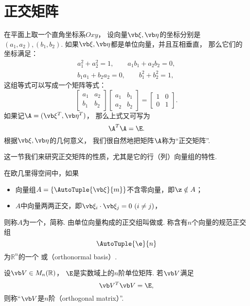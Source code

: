 \section{正交矩阵}
在平面上取一个直角坐标系\(Oxy\)，
设向量\(\a,\b\)的坐标分别是\((a_1,a_2),(b_1,b_2)\).
如果\(\a,\b\)都是单位向量，并且互相垂直，
那么它们的坐标满足：\[
	\begin{split}
		a_1^2+a_2^2=1, \qquad
		a_1b_1+a_2b_2=0, \\
		b_1a_1+b_2a_2=0, \qquad
		b_1^2+b_2^2=1,
	\end{split}
\]
这组等式可以写成一个矩阵等式：\[
	\begin{bmatrix}
		a_1 & a_2 \\
		b_1 & b_2
	\end{bmatrix}
	\begin{bmatrix}
		a_1 & b_1 \\
		a_2 & b_2
	\end{bmatrix}
	= \begin{bmatrix}
		1 & 0 \\
		0 & 1
	\end{bmatrix}.
\]
如果记\(\A=(\a^T,\b^T)\)，
那么上式又可写为\[
	\A^T\A=\E.
\]
根据\(\a,\b\)的几何意义，
我们很自然地把矩阵\(\A\)称为“正交矩阵”.

这一节我们来研究正交矩阵的性质，尤其是它的行（列）向量组的特性.

\begin{definition}
在欧几里得空间中，如果
\begin{itemize}
	\item 向量组\(A=\{\AutoTuple{\a}{m}\}\)不含零向量，即\(\z \notin A\)；
	\item \(A\)中向量两两正交，即\(\a_i \cdot \a_j = 0\ (i \neq j)\)，
\end{itemize}
则称\(A\)为一个，简称.
由单位向量构成的正交组叫做或.
称含有\(n\)个向量的规范正交组
\[
	\AutoTuple{\e}{n}
\]
为\(\mathbb{R}^n\)的一个%
或（orthonormal basis）.
\end{definition}

\begin{definition}\label{definition:正交矩阵.正交矩阵的定义}
设\(\Q \in M_n(\mathbb{R})\)，
\(\E\)是实数域上的\(n\)阶单位矩阵.
若\(\Q\)满足\begin{equation}\label{equation:正交矩阵.正交矩阵的定义式}
	\Q^T \Q = \E,
\end{equation}
则称“\(\Q\)是\(n\)阶（orthogonal matrix）”.
\end{definition}


